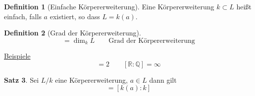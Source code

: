 \documentclass[12pt,parskip=full]{scrartcl}
\newcommand{\setQ}{\mathbb{Q}}
\newcommand{\setR}{\mathbb{R}}
\newcommand{\setC}{\mathbb{C}}
\newcommand{\heading}{\underline}
\theoremstyle{definition}
\newtheorem{theorem}{Satz}[section]
\newtheorem{definition}[theorem]{Definition}
\theoremstyle{remark}
\begin{document}
	\begin{definition}[Einfache Körpererweiterung]
		Eine Körpererweiterung $k \subset L$ heißt einfach, falls $a$ existiert, so dass $L = k(a)$.
	\end{definition}

	\begin{definition}[Grad der Körpererweiterung]
		\begin{equation*}
			[L:k] = \dim_k L \qquad \text{Grad der Körpererweiterung}
		\end{equation*}
	\end{definition}

	\heading{Beispiele}
	\begin{equation*}
		[\setC : \setR] = 2 \qquad [\setR: \setQ]  = \infty
	\end{equation*}
	
	\begin{theorem}
		Sei $L/k$ eine Körpererweiterung, $a \in L$ dann gilt
		\begin{equation*}
			[a: k] = [k(a): k]
 		\end{equation*}
	\end{theorem}
\end{document}
